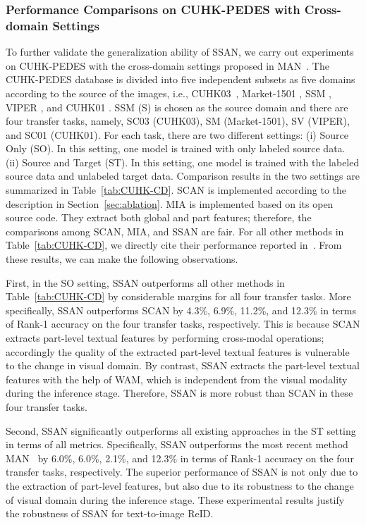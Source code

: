 \documentclass[journal]{IEEEtran}
\begin{document}
\subsubsection{Performance Comparisons on CUHK-PEDES with Cross-domain Settings}
To further validate the generalization ability of SSAN, we carry out experiments on CUHK-PEDES with the cross-domain settings proposed in MAN~\cite{jing2020cross}.
The CUHK-PEDES database is divided into five independent subsets as five domains according to the source of the images,
i.e., CUHK03~\cite{li2014deepreid}, Market-1501 \cite{zheng2015person}, SSM \cite{xiao2016end}, VIPER \cite{gray2007evaluating}, and CUHK01 \cite{li2012human}.
SSM (S) is chosen as the source domain and there are four transfer tasks, namely, SC03 (CUHK03), SM (Market-1501), SV (VIPER), and SC01 (CUHK01). For each task, there are two different settings: (i) Source Only (SO). In this setting, one model is trained with only labeled source data.
(ii) Source and Target (ST). In this setting, one model is trained with the labeled source data and unlabeled target data.
Comparison results in the two settings are summarized in Table~\ref{tab:CUHK-CD}.
SCAN is implemented according to the description in Section~\ref{sec:ablation}. MIA is implemented based on its open source code. They extract both global and part features; therefore, the comparisons among SCAN, MIA, and SSAN are fair.
For all other methods in Table~\ref{tab:CUHK-CD}, we directly cite their performance reported in~\cite{jing2020cross}.
From these results, we can make the following observations.

First, in the SO setting, SSAN outperforms all other methods in Table~\ref{tab:CUHK-CD} by considerable margins for all four transfer tasks.
More specifically, SSAN outperforms SCAN \cite{lee2018stacked} by 4.3\%, 6.9\%, 11.2\%, and 12.3\% in terms of Rank-1 accuracy on the four transfer tasks, respectively.
This is because SCAN extracts part-level textual features by performing cross-modal operations;
accordingly the quality of the extracted part-level textual features is vulnerable to the change in visual domain.
By contrast, SSAN extracts the part-level textual features with the help of WAM, which is independent from the visual modality during the inference stage.
Therefore, SSAN is more robust than SCAN in these four transfer tasks.

Second, SSAN significantly outperforms all existing approaches in the ST setting in terms of all metrics.
Specifically, SSAN outperforms the most recent method MAN~\cite{jing2020cross} by 6.0\%, 6.0\%, 2.1\%, and 12.3\% in terms of Rank-1 accuracy on the four transfer tasks, respectively.
The superior performance of SSAN is not only due to the extraction of part-level features, but also due to its robustness to the change of visual domain during the inference stage.
These experimental results justify the robustness of SSAN for text-to-image ReID.
\end{document}
